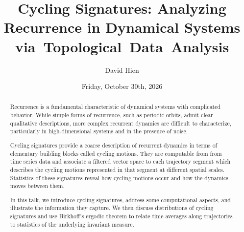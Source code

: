 \documentclass{UAmathtalk}
\author{David Hien}
\title{Cycling Signatures: Analyzing Recurrence in Dynamical Systems via~Topological~Data~Analysis}
\date{Friday, October 30th, 2026}
\begin{document}
\maketitle
\renewcommand*{\abstractsize}{\fontsize{13.5}{16.2}\selectfont}
\begin{abstract}
    {
Recurrence is a fundamental characteristic of dynamical systems with complicated behavior. While simple forms of recurrence, such as periodic orbits, admit clear qualitative descriptions, more complex recurrent dynamics are difficult to characterize, particularly in high-dimensional systems and in the presence of noise.

Cycling signatures provide a coarse description of recurrent dynamics in terms of elementary building blocks called cycling motions. They are computable from from time series data and associate a filtered vector space to each trajectory segment which describes the cycling motions represented in that segment at different spatial scales. 
Statistics of these signatures reveal how cycling motions occur and how the dynamics moves between them.

In this talk, we introduce cycling signatures, address some computational aspects, and illustrate the information they capture. We then discuss distributions of cycling signatures and use Birkhoff’s ergodic theorem to relate time averages along trajectories to statistics of the underlying invariant measure.     }
\end{abstract}
\end{document}

